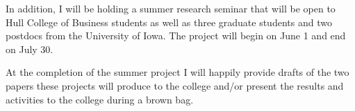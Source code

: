 \begin{full}
In addition, I will be holding a summer research seminar that will be
open to Hull College of Business students as well as three graduate
students and two postdocs from the University of Iowa.  The project
will begin on June 1 and end on July 30.

At the completion of the summer project I will happily provide drafts
of the two papers these projects will produce to the college and/or
present the results and activities to the college during a brown bag.


\end{full}





